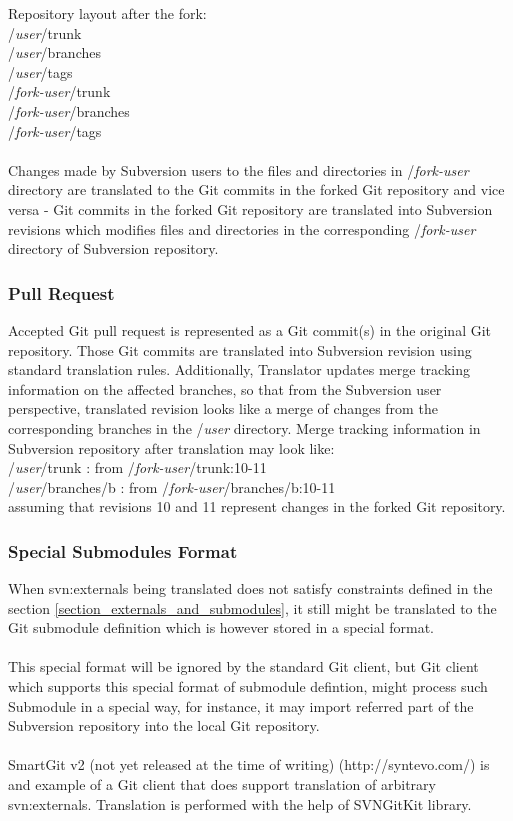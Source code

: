 Repository layout after the fork:\\

/\emph{user}/trunk\\
/\emph{user}/branches\\
/\emph{user}/tags\\
/\emph{fork-user}/trunk\\
/\emph{fork-user}/branches\\
/\emph{fork-user}/tags\\\\
Changes made by Subversion users to the files and directories in /\emph{fork-user} directory are translated to the Git commits in the forked Git
repository and vice versa - Git commits in the forked Git repository are translated into Subversion revisions which modifies files
and directories in the corresponding /\emph{fork-user} directory of Subversion repository.

\subsubsection{Pull Request}

Accepted Git pull request is represented as a Git commit(s) in the original Git repository. Those Git commits are translated into Subversion
revision using standard translation rules. Additionally, Translator updates merge tracking information on the affected branches, so that
from the Subversion user perspective, translated revision looks like a merge of changes from the corresponding branches in the /\emph{user} directory. 
Merge tracking information in Subversion repository after translation may look like:\\

/\emph{user}/trunk : from /\emph{fork-user}/trunk:10-11\\
/\emph{user}/branches/b : from /\emph{fork-user}/branches/b:10-11\\

assuming that revisions 10 and 11 represent changes in the forked Git repository.

\subsubsection{Special Submodules Format}
When svn:externals being translated does not satisfy constraints defined in the section \ref{section_externals_and_submodules},
it still might be translated to the Git submodule definition which is however stored in a special format.
\\\\
This special format will be ignored by the standard Git client, but Git client which supports this special format of submodule defintion, 
might process such Submodule in a special way, for instance, it may import referred part of the Subversion repository into the local Git repository.
\\\\
SmartGit v2 (not yet released at the time of writing) (http://syntevo.com/) is and example of a Git client that does support translation of arbitrary svn:externals. Translation
is performed with the help of SVNGitKit library.

